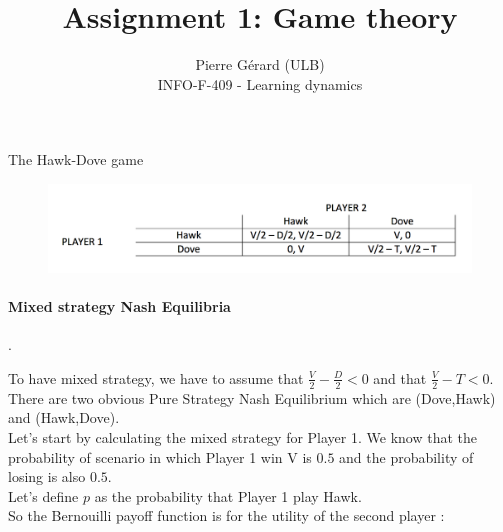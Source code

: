 \documentclass[11pt]{article}
\newenvironment{exercise}[2][Exercise]{\begin{trivlist}
\item[\hskip \labelsep {\bfseries #1}\hskip \labelsep {\bfseries #2.}]}{\end{trivlist}}
\begin{document}
 
 
\setlength\parindent{0pt}
 
\title{Assignment 1: Game theory}%
\author{Pierre Gérard (ULB)\\ %
INFO-F-409 - Learning dynamics} %
 
\maketitle

\begin{exercise}{1} The Hawk-Dove game
\end{exercise}

\begin{figure}[H]
   \includegraphics[width=\textwidth]{img/exo1.png}
\end{figure}


\paragraph{Mixed strategy Nash Equilibria}

.

To have mixed strategy, we have to assume that $\frac{V}{2}-\frac{D}{2}<0$ and that $\frac{V}{2}-T<0$. \\

There are two obvious Pure Strategy Nash Equilibrium which are (Dove,Hawk) and (Hawk,Dove). \\

Let's start by calculating the mixed strategy for Player 1. We know that the probability of scenario in which Player 1 win V is $0.5$ and the probability of losing is also $0.5$.\\

Let's define $p$ as the probability that Player 1 play Hawk.\\

So the Bernouilli payoff function is for the utility of the second player :\\
\end{document}
